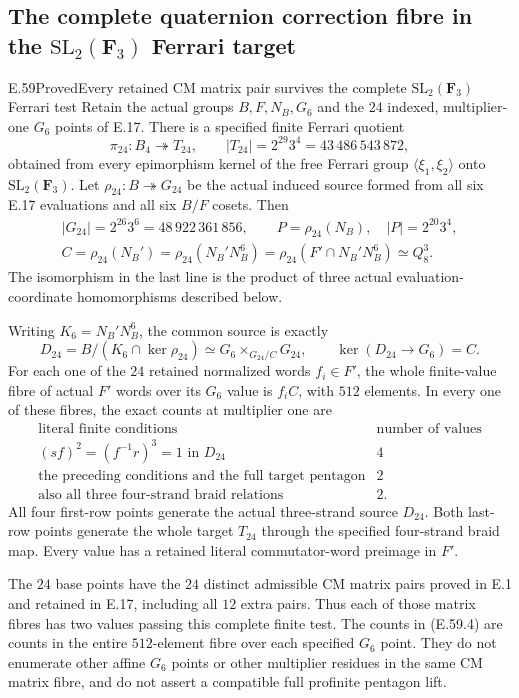 \subsection{The complete quaternion correction fibre in the \texorpdfstring{$\mathrm{SL}_2(\mathbf F_3)$}{SL2(F3)} Ferrari target}

\begin{statement}{E.59}{Proved}{Every retained CM matrix pair survives the complete \texorpdfstring{$\mathrm{SL}_2(\mathbf F_3)$}{SL2(F3)} Ferrari test}
Retain the actual groups $B,F,N_B,G_6$ and the $24$ indexed,
multiplier-one $G_6$ points of E.17. There is a specified finite
Ferrari quotient
\[
 \pi_{24}:B_4\twoheadrightarrow T_{24},\qquad
 |T_{24}|=2^{29}3^4=43\,486\,543\,872,
 \tag{E.59.1}
\]
obtained from every epimorphism kernel of the free Ferrari group
$\langle\xi_1,\xi_2\rangle$ onto $\mathrm{SL}_2(\mathbf F_3)$.
Let $\rho_{24}:B\twoheadrightarrow G_{24}$ be the actual induced
source formed from all six E.17 evaluations and all six $B/F$
cosets. Then
\[
 \begin{gathered}
 |G_{24}|=2^{26}3^6=48\,922\,361\,856,\qquad
 P=\rho_{24}(N_B),\quad |P|=2^{20}3^4,\\
 C=\rho_{24}(N_B')=\rho_{24}(N_B'N_B^6)
   =\rho_{24}(F'\cap N_B'N_B^6)\simeq Q_8^3.
 \end{gathered}
 \tag{E.59.2}
\]
The isomorphism in the last line is the product of three actual
evaluation-coordinate homomorphisms described below.

Writing $K_6=N_B'N_B^6$, the common source is exactly
\[
 D_{24}=B/(K_6\cap\ker\rho_{24})
     \simeq G_6\mathbin{\times_{G_{24}/C}}G_{24},
 \qquad \ker(D_{24}\to G_6)=C.
 \tag{E.59.3}
\]
For each one of the $24$ retained normalized words $f_i\in F'$, the
whole finite-value fibre of actual $F'$ words over its $G_6$ value
is $f_iC$, with $512$ elements. In every one of these fibres,
the exact counts at multiplier one are
\[
 \begin{array}{l|r}
 \text{literal finite conditions}&\text{number of values}\\\hline
 (sf)^2=(f^{-1}r)^3=1\text{ in }D_{24}&4\\
 \text{the preceding conditions and the full target pentagon}&2\\
 \text{also all three four-strand braid relations}&2.
 \end{array}
 \tag{E.59.4}
\]
All four first-row points generate the actual three-strand source
$D_{24}$. Both last-row points generate the whole target $T_{24}$
through the specified four-strand braid map. Every value has a
retained literal commutator-word preimage in $F'$.

The $24$ base points have the $24$ distinct admissible CM matrix
pairs proved in E.1 and retained in E.17, including all $12$ extra
pairs. Thus each of those matrix fibres has two values passing
this complete finite test. The counts in \textup{(E.59.4)} are
counts in the entire $512$-element fibre over each specified
$G_6$ point. They do not enumerate other affine $G_6$ points or
other multiplier residues in the same CM matrix fibre, and do
not assert a compatible full profinite pentagon lift.
\end{statement}

